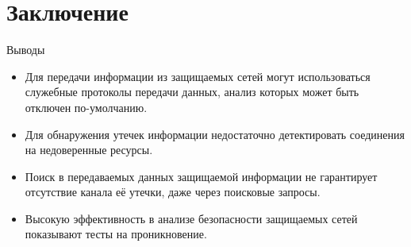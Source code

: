 \chapter*{Заключение}

Выводы

\begin{itemize}
	\item
		Для передачи информации из защищаемых сетей могут использоваться служебные протоколы передачи данных, анализ которых может быть отключен по-умолчанию.
	\item
		Для обнаружения утечек информации недостаточно детектировать соединения на недоверенные ресурсы.
	\item
		Поиск в передаваемых данных защищаемой информации не гарантирует отсутствие канала её утечки, даже через поисковые запросы.
	\item
		Высокую эффективность в анализе безопасности защищаемых сетей показывают тесты на проникновение.
\end{itemize}
